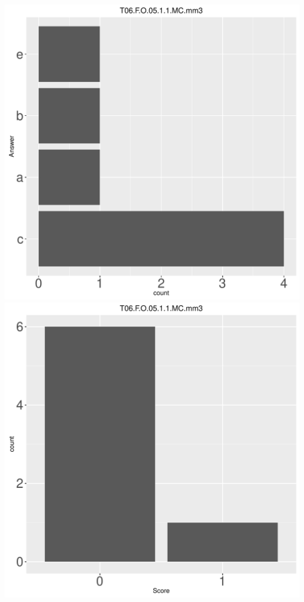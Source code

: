 \documentclass[12pt,english,nohyper]{tufte-handout}\usepackage[]{graphicx}\usepackage[]{color}
\begin{document}
\begin{center} \includegraphics[width=.45\linewidth]{Topic06_AB_55_answer} \includegraphics[width=.45\linewidth]{Topic06_AB_55_score} \end{center} 
\end{document}

